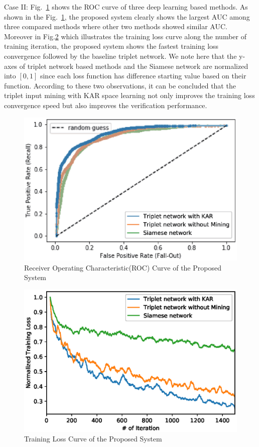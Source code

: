 \documentclass[runningheads]{llncs}
\begin{document}
Case II: Fig.~\ref{fig3} shows the ROC curve of three deep learning based methods. As shown in the Fig.~\ref{fig3}, the proposed system clearly shows the largest AUC among three compared methods where other two methods showed similar AUC. Moreover in Fig.\ref{fig2} which illustrates the training loss curve along the number of training iteration, the proposed system shows the fastest training loss convergence followed by the baseline triplet network. We note here that the y-axes of triplet network based methods and the Siamese network are normalized into $[0,1]$ since each loss function has difference starting value based on their function. According to these two observations, it can be concluded that the triplet input mining with KAR space learning not only improves the training loss convergence speed but also improves the verification performance.

\begin{figure}[!h]
    \includegraphics[width=\textwidth]{fig_roc_v5.eps}
    \caption{Receiver Operating Characteristic(ROC) Curve of the Proposed System} \label{fig3}
\end{figure}

    \begin{figure}[!h]
    \includegraphics[width=\textwidth]{normalized_loss_curve_ma30_v1.eps}
    \caption{Training Loss Curve of the Proposed System} \label{fig2}
\end{figure}
\end{document}
